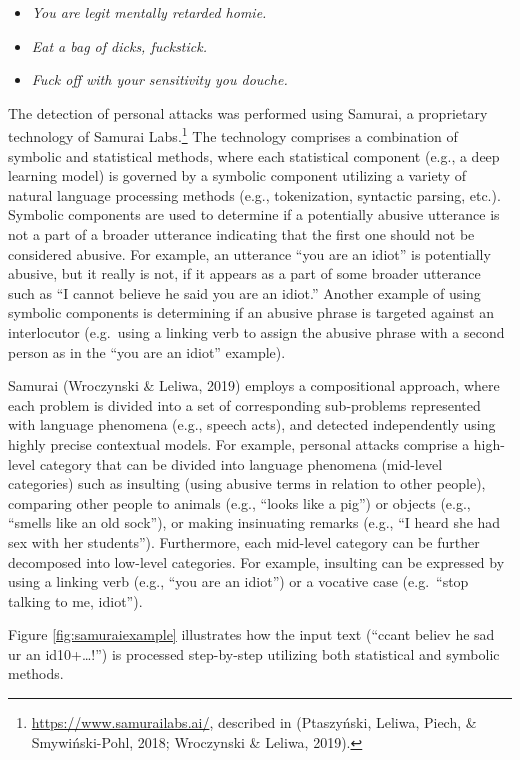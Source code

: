 \documentclass[
  10pt,
  dvipsnames]{scrartcl}
\begin{document}
\begin{itemize} 
\item \emph{You are legit mentally retarded homie.}
\item \emph {Eat a bag of dicks, fuckstick.}
\item \emph {Fuck off with your sensitivity you douche.} 
\end{itemize}

The detection of personal attacks was performed using Samurai, a
proprietary technology of Samurai Labs.\footnote{\url{https://www.samurailabs.ai/},
  described in (Ptaszyński, Leliwa, Piech, \& Smywiński-Pohl, 2018;
  Wroczynski \& Leliwa, 2019).} The technology comprises a combination
of symbolic and statistical methods, where each statistical component
(e.g., a deep learning model) is governed by a symbolic component
utilizing a variety of natural language processing methods (e.g.,
tokenization, syntactic parsing, etc.). Symbolic components are used to
determine if a potentially abusive utterance is not a part of a broader
utterance indicating that the first one should not be considered
abusive. For example, an utterance ``you are an idiot'' is potentially
abusive, but it really is not, if it appears as a part of some broader
utterance such as ``I cannot believe he said you are an idiot.'' Another
example of using symbolic components is determining if an abusive phrase
is targeted against an interlocutor (e.g.~using a linking verb to assign
the abusive phrase with a second person as in the ``you are an idiot''
example).

Samurai (Wroczynski \& Leliwa, 2019) employs a compositional approach,
where each problem is divided into a set of corresponding sub-problems
represented with language phenomena (e.g., speech acts), and detected
independently using highly precise contextual models. For example,
personal attacks comprise a high-level category that can be divided into
language phenomena (mid-level categories) such as insulting (using
abusive terms in relation to other people), comparing other people to
animals (e.g., ``looks like a pig'') or objects (e.g., ``smells like an
old sock''), or making insinuating remarks (e.g., ``I heard she had sex
with her students''). Furthermore, each mid-level category can be
further decomposed into low-level categories. For example, insulting can
be expressed by using a linking verb (e.g., ``you are an idiot'') or a
vocative case (e.g.~``stop talking to me, idiot'').

Figure \ref{fig:samuraiexample} illustrates how the input text (``ccant
believ he sad ur an id10+\ldots!'') is processed step-by-step utilizing
both statistical and symbolic methods.
\end{document}
